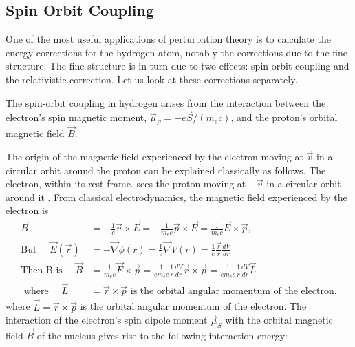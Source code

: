 \subsection{Spin Orbit Coupling}
One of the most useful applications of perturbation theory is to calculate the energy corrections for the hydrogen atom, notably the corrections due to the fine structure. The fine structure is in turn due to two effects: spin-orbit coupling and the relativistic correction. Let us look at these corrections separately.\\
\par The spin-orbit coupling in hydrogen arises from the interaction between the electron's spin magnetic moment, $\vec{\mu}_{S}=-e \vec{S} /\left(m_{e} c\right)$, and the proton's orbital magnetic field $\vec{B}$.

The origin of the magnetic field experienced by the electron moving at $\vec{v}$ in a circular orbit around the proton can be explained classically as follows. The electron, within its rest frame. sees the proton moving at $-\vec{v}$ in a circular orbit around it . From classical electrodynamics, the magnetic field experienced by the electron is
	$$
	\begin{aligned}
	\vec{B}&=-\frac{1}{c} \vec{v} \times \vec{E}=-\frac{1}{m_{e} c} \vec{p} \times \vec{E}=\frac{1}{m_{e} c} \vec{E} \times \vec{p},\\
	\text{But }\quad\vec{E}(\vec{r})&=-\vec{\nabla} \phi(r)=\frac{1}{e} \vec{\nabla} V(r)=\frac{1}{e} \frac{\vec{r}}{r} \frac{d V}{d r} \\
	\text{Then B is }\quad\vec{B}&=\frac{1}{m_{e} c} \vec{E} \times \vec{p}=\frac{1}{e m_{e} c} \frac{1}{r} \frac{d V}{d r} \vec{r} \times \vec{p}=\frac{1}{e m_{e} c} \frac{1}{r} \frac{d V}{d r} \vec{L}\\
\text{	where }\quad\vec{L}&=\vec{r} \times \vec{p}\text{ is the orbital angular momentum of the electron.}
\end{aligned}
$$
where $\vec{L}=\vec{r} \times \vec{p}$ is the orbital angular momentum of the electron.
The interaction of the electron's spin dipole moment $\vec{\mu}_{S}$ with the orbital magnetic field $\vec{B}$ of the nucleus gives rise to the following interaction energy:
